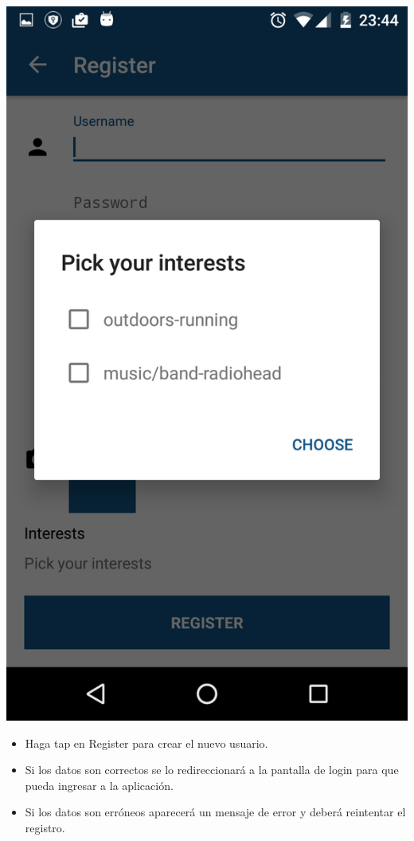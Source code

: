\documentclass[letterpaper,10pt,english]{sphinxmanual}
\begin{document}
\includegraphics{interests.png}
\begin{itemize}
\item {} 
Haga tap en Register para crear el nuevo usuario.

\item {} 
Si los datos son correctos se lo redireccionará a la pantalla de login para que pueda ingresar a la aplicación.

\item {} 
Si los datos son erróneos aparecerá un mensaje de error y deberá reintentar el registro.

\end{itemize}
\end{document}
